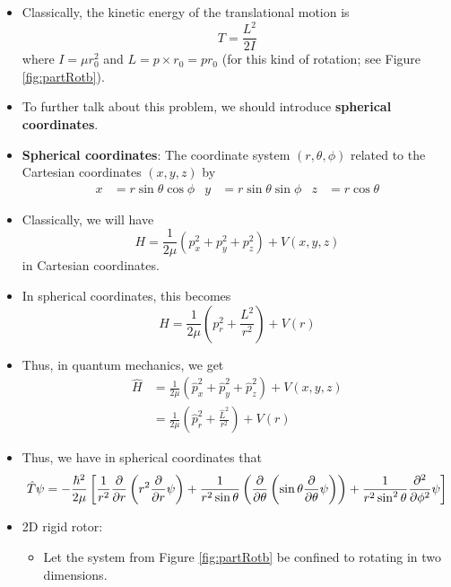\documentclass[../notes.tex]{subfiles}
\begin{document}
\begin{itemize}
\begin{itemize}
    \end{itemize}
    \item Classically, the kinetic energy of the translational motion is
    \begin{equation*}
        T = \frac{L^2}{2I}
    \end{equation*}
    where $I=\mu r_0^2$ and $L=p\times r_0=pr_0$ (for this kind of rotation; see Figure \ref{fig:partRotb}).
    \item To further talk about this problem, we should introduce \textbf{spherical coordinates}.
    \item \textbf{Spherical coordinates}: The coordinate system $(r,\theta,\phi)$ related to the Cartesian coordinates $(x,y,z)$ by
    \begin{align*}
        x &= r\sin\theta\cos\phi&
        y &= r\sin\theta\sin\phi&
        z &= r\cos\theta
    \end{align*}
    \item Classically, we will have
    \begin{equation*}
        H = \frac{1}{2\mu}(p_x^2+p_y^2+p_z^2)+V(x,y,z)
    \end{equation*}
    in Cartesian coordinates.
    \item In spherical coordinates, this becomes
    \begin{equation*}
        H = \frac{1}{2\mu}\left( p_r^2+\frac{L^2}{r^2} \right)+V(r)
    \end{equation*}
    \item Thus, in quantum mechanics, we get
    \begin{align*}
        \hat{H} &= \frac{1}{2\mu}(\hat{p}_x^2+\hat{p}_y^2+\hat{p}_z^2)+V(x,y,z)\\
        &= \frac{1}{2\mu}\left( \hat{p}_r^2+\frac{\hat{L}^2}{r^2} \right)+V(r)
    \end{align*}
    \item Thus, we have in spherical coordinates that
    \begin{equation*}
        \hat{T}\psi = -\frac{\hbar^2}{2\mu}\left[ \frac{1}{r^2}\pdv{r}\left( r^2\pdv{r}\psi \right)+\frac{1}{r^2\sin\theta}\left( \pdv{\theta}\left( \sin\theta\pdv{\theta}\psi \right) \right)+\frac{1}{r^2\sin^2\theta}\pdv[2]{\phi}\psi \right]
    \end{equation*}
    \item 2D rigid rotor:
    \begin{itemize}
        \item Let the system from Figure \ref{fig:partRotb} be confined to rotating in two dimensions.

\end{itemize}
\end{itemize}
\end{document}
